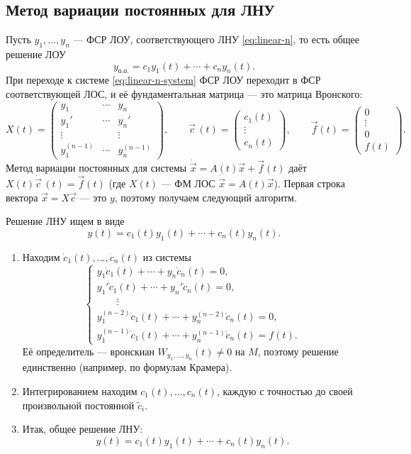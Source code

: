 \documentclass[12pt,a4paper]{article}
\numberwithin{equation}{section}
\newcommand{\vect}[1]{\vec{#1}}
\begin{document}
\subsection{Метод вариации постоянных для ЛНУ}
\label{sec:variation}

Пусть \(y_1,\ldots,y_n\) --- ФСР ЛОУ, соответствующего ЛНУ \eqref{eq:linear-n}, то есть общее решение ЛОУ
\[
y_{\text{о.о.}}=c_1y_1(t)+\cdots+c_ny_n(t).
\]
При переходе к системе \eqref{eq:linear-n-system} ФСР ЛОУ переходит в ФСР соответствующей ЛОС, и её фундаментальная матрица --- это матрица Вронского:
\[
X(t)=
\begin{pmatrix}
y_1&\cdots&y_n\\
y_1'&\cdots&y_n'\\
\vdots&&\vdots\\
y_1^{(n-1)}&\cdots&y_n^{(n-1)}
\end{pmatrix},
\qquad
\vect{c}\,(t)=
\begin{pmatrix}c_1(t)\\\vdots\\c_n(t)\end{pmatrix},
\qquad
\vect{f}(t)=
\begin{pmatrix}0\\\vdots\\0\\f(t)\end{pmatrix}.
\]
Метод вариации постоянных для системы \(\dot{\vect{x}}=A(t)\vect{x}+\vect{f}(t)\) даёт \(X(t)\dot{\vect{c}}\,(t)=\vect{f}(t)\) (где \(X(t)\) --- ФМ ЛОС \(\dot{\vect{x}}=A(t)\vect{x}\)). Первая строка вектора \(\vect{x}=X\vect{c}\) --- это \(y\), поэтому получаем следующий алгоритм.

\begin{theoremHSE}
Решение ЛНУ ищем в виде
\[
y(t)=c_1(t)y_1(t)+\cdots+c_n(t)y_n(t).
\]
\begin{enumerate}
\item Находим \(\dot c_1(t),\ldots,\dot c_n(t)\) из системы
\[
\begin{cases}
y_1\dot c_1(t)+\cdots+y_n\dot c_n(t)=0,\\
y_1'\dot c_1(t)+\cdots+y_n'\dot c_n(t)=0,\\
\qquad\vdots\\
y_1^{(n-2)}\dot c_1(t)+\cdots+y_n^{(n-2)}\dot c_n(t)=0,\\
y_1^{(n-1)}\dot c_1(t)+\cdots+y_n^{(n-1)}\dot c_n(t)=f(t).
\end{cases}
\]
Её определитель --- вронскиан \(W_{y_1,\ldots,y_n}(t)\neq0\) на \(M\), поэтому решение единственно (например, по формулам Крамера).
\item Интегрированием находим \(c_1(t),\ldots,c_n(t)\), каждую с точностью до своей произвольной постоянной \(\tilde c_i\).
\item Итак, общее решение ЛНУ:
\[
y(t)=c_1(t)y_1(t)+\cdots+c_n(t)y_n(t).
\]
\end{enumerate}
\end{theoremHSE}
\end{document}
